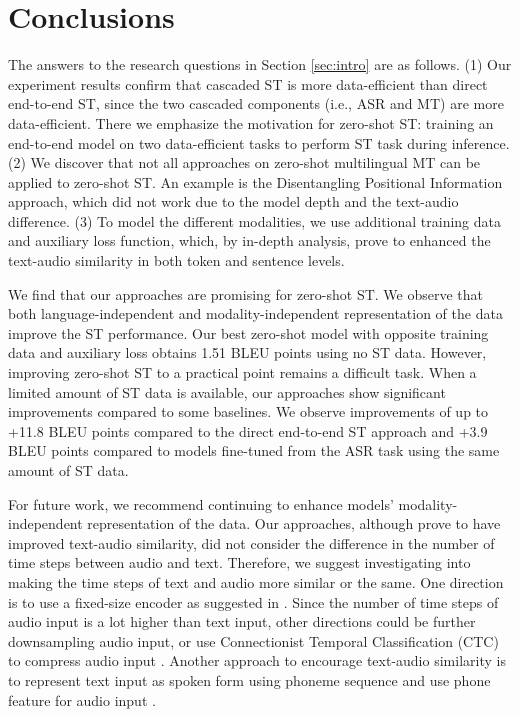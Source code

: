 \documentclass[conference]{IEEEtran}
\begin{document}
	\section{Conclusions} \label{sec:conclusions}
	The answers to the research questions in Section \ref{sec:intro} are as follows. (1) Our experiment results confirm that cascaded ST is more data-efficient than direct end-to-end ST, since the two cascaded components (i.e., ASR and MT) are more data-efficient. There we emphasize the motivation for zero-shot ST: training an end-to-end model on two data-efficient tasks to perform ST task during inference. (2) We discover that not all approaches on zero-shot multilingual MT can be applied to zero-shot ST. An example is the Disentangling Positional Information approach, which did not work due to the model depth and the text-audio difference. (3) To model the different modalities, we use additional training data and auxiliary loss function, which, by in-depth analysis, prove to enhanced the text-audio similarity in both token and sentence levels.
	
	We find that our approaches are promising for zero-shot ST. We observe that both language-independent and modality-independent representation of the data  improve the ST performance. Our best zero-shot model with opposite training data and auxiliary loss obtains 1.51 BLEU points using no ST data. However, improving zero-shot ST to a practical point remains a difficult task. When a limited amount of ST data is available, our approaches show significant improvements compared to some baselines. We observe improvements of up to +11.8 BLEU points compared to the direct end-to-end ST approach and +3.9 BLEU points compared to models fine-tuned from the ASR task using the same amount of ST data.
	
	For future work, we recommend continuing to enhance models'  modality-independent representation of the data. Our approaches, although prove to have improved text-audio similarity, did not consider the difference in the number of time steps between audio and text. Therefore, we suggest investigating into making the time steps of text and audio more similar or the same. One direction is to use a fixed-size encoder as suggested in \cite{ZS-Quan}. Since the number of time steps of audio input is a lot higher than text input, other directions could be further downsampling audio input, or use Connectionist Temporal Classification (CTC) to compress audio input \cite{gaido2021ctc}. Another approach to encourage text-audio similarity is to represent text input as spoken form using phoneme sequence \cite{tang2021general} and use phone feature for audio input \cite{salesky2020phone}.
	
\end{document}
